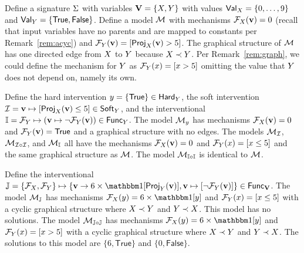 \documentclass[twoside,11pt]{article}
\begin{document}
\begin{example}
Define a signature $\Sigma$ with variables $\mathbf{V} = \{X, Y\}$ with values $\mathsf{Val}_{X} = \{0, \dots, 9\}$ and $\mathsf{Val}_{Y} = \{\mathsf{True}, \mathsf{False}\}$. Define a model $\mathcal{M}$ with mechanisms $\mathcal{F}_{X}(\mathbf{v}) = 0$ (recall that input variables have no parents and are mapped to constants per Remark~\ref{rem:acyc}) and $\mathcal{F}_{Y}(\mathbf{v}) = [\mathsf{Proj}_{X}(\mathbf{v}) > 5]$. The graphical structure of $\mathcal{M}$ has one directed edge from $X$ to $Y$ because $X \prec Y$. Per Remark~\ref{rem:graph}, we could define the mechanism for $Y$ as $\mathcal{F}_{Y}(x) = [x > 5]$ omitting the value that $Y$ does not depend on, namely its own.

Define the hard intervention $y = \{\mathsf{True}\} \in \mathsf{Hard}_{Y}$, the soft intervention $\mathcal{I} = \mathbf{v} \mapsto [\mathsf{Proj}_{X}(\mathbf{v}) \leq 5] \in \mathsf{Soft}_{Y}$, and the interventional $\mathbb{I} = \mathcal{F}_{Y} \mapsto (\mathbf{v} \mapsto \lnot \mathcal{F}_{Y}(\mathbf{v})) \in \mathsf{Func}_{Y}$. The model $\mathcal{M}_{y}$ has mechanisms $\mathcal{F}_{X}(\mathbf{v}) = 0$ and $\mathcal{F}_{Y}(\mathbf{v}) = \mathsf{True}$ and a graphical structure with no edges. The models $\mathcal{M}_{\mathcal{I}}$, $\mathcal{M}_{\mathcal{I}\circ \mathcal{I}}$, and $\mathcal{M}_{\mathbb{I}}$ all have the mechanisms $\mathcal{F}_{X}(\mathbf{v}) = 0$ and $\mathcal{F}_{Y}(x) = [x \leq 5]$ and the same graphical structure as $\mathcal{M}$. The model $\mathcal{M}_{\mathbb{I} \circ \mathbb{I}}$ is identical to $\mathcal{M}$.

Define the interventional $\intall = \{\mechanism{\onevar}, \mechanism{\onevarr}\} \mapsto \{ \tset \to 6 \times \indicator{\project{\tset}{\onevarr}},\tset \mapsto [\lnot \mechanism{\onevarr}(\tset)] \} \in \allintals_{\allvars}$. The model $\mathcal{M}_{\mathbb{J}}$ has mechanisms $\mechanism{\onevar}(\onevall) = 6 \times \indicator{\onevall}$ and $\mathcal{F}_{Y}(x) = [x \leq 5]$ 
with a cyclic graphical structure where $X \prec Y$ and $Y \prec X$. This model has no solutions. The model $\mathcal{M}_{\mathbb{J} \circ \mathbb{J}}$ has mechanisms $\mechanism{\onevar}(\onevall) = 6 \times \indicator{\onevall}$ and $\mathcal{F}_{Y}(x) = [x > 5]$ with a cyclic graphical structure where $X \prec Y$ and $Y \prec X$. The solutions to this model are $\{6, \mathsf{True}\}$ and $\{0, \mathsf{False}\}$.
\end{example}
\end{document}
